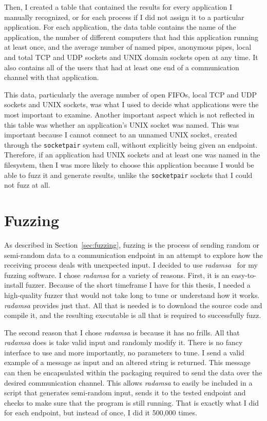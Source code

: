 Then, I created a table that contained the results for every application I manually recognized, or for each process if I did not assign it to a particular application.  For each application, the data table contains the name of the application, the number of different computers that had this application running at least once, and the average number of named pipes, anonymous pipes, local and total TCP and UDP sockets and UNIX domain sockets open at any time.  It also contains all of the users that had at least one end of a communication channel with that application.

This data, particularly the average number of open FIFOs, local TCP and UDP sockets and UNIX sockets, was what I used to decide what applications were the most important to examine.  Another important aspect which is not reflected in this table was whether an application's UNIX socket was named.  This was important because I cannot connect to an unnamed UNIX socket, created through the \texttt{socketpair} system call, without explicitly being given an endpoint.  Therefore, if an application had UNIX sockets and at least one was named in the filesystem, then I was more likely to choose this application because I would be able to fuzz it and generate results, unlike the \texttt{socketpair} sockets that I could not fuzz at all.

\section{Fuzzing}
\label{sec:fuzzingMethods}
As described in Section~\ref{sec:fuzzing}, fuzzing is the process of sending random or semi-random data to a communication endpoint in an attempt to explore how the receiving process deals with unexpected input.  I decided to use \textit{radamsa}~\cite{radamsa} for my fuzzing software.  I chose \textit{radamsa} for a variety of reasons.  First, it is an easy-to-install fuzzer.  Because of the short timeframe I have for this thesis, I needed a high-quality fuzzer that would not take long to tune or understand how it works.  \textit{radamsa} provides just that.  All that is needed is to download the source code and compile it, and the resulting executable is all that is required to successfully fuzz.

The second reason that I chose \textit{radamsa} is because it has no frills.  All that \textit{radamsa} does is take valid input and randomly modify it.  There is no fancy interface to use and more importantly, no parameters to tune.  I send a valid example of a message as input and an altered string is returned.  This message can then be encapsulated within the packaging required to send the data over the desired communication channel.  This allows \textit{radamsa} to easily be included in a script that generates semi-random input, sends it to the tested endpoint and checks to make sure that the program is still running.  That is exactly what I did for each endpoint, but instead of once, I did it 500,000 times.

